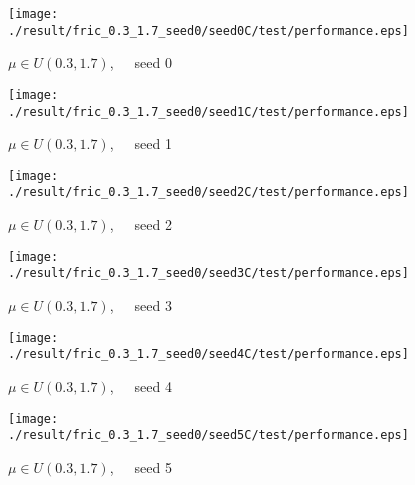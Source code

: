 \begin{figure}[p]
 \begin{minipage}{0.49\hsize}
  \begin{center}
 \texttt{[image: ./result/fric\_0.3\_1.7\_seed0/seed0C/test/performance.eps]}
  \caption{$\mu\in U(0.3,1.7)$,~~~seed 0
  }
  \end{center}
 \end{minipage}
 \begin{minipage}{0.49\hsize}
   \begin{center}
 \texttt{[image: ./result/fric\_0.3\_1.7\_seed0/seed1C/test/performance.eps]}
  \caption{$\mu\in U(0.3,1.7)$,~~~seed 1
  }
  \end{center}
 \end{minipage}
\end{figure}

\begin{figure}[p]
 \begin{minipage}{0.49\hsize}
  \begin{center}
 \texttt{[image: ./result/fric\_0.3\_1.7\_seed0/seed2C/test/performance.eps]}
  \caption{$\mu\in U(0.3,1.7)$,~~~seed 2
  }
  \end{center}
 \end{minipage}
 \begin{minipage}{0.49\hsize}
   \begin{center}
 \texttt{[image: ./result/fric\_0.3\_1.7\_seed0/seed3C/test/performance.eps]}
  \caption{$\mu\in U(0.3,1.7)$,~~~seed 3
  }
  \end{center}
 \end{minipage}
\end{figure}

\begin{figure}[p]
 \begin{minipage}{0.49\hsize}
  \begin{center}
 \texttt{[image: ./result/fric\_0.3\_1.7\_seed0/seed4C/test/performance.eps]}
  \caption{$\mu\in U(0.3,1.7)$,~~~seed 4
  }
  \end{center}
 \end{minipage}
 \begin{minipage}{0.49\hsize}
   \begin{center}
 \texttt{[image: ./result/fric\_0.3\_1.7\_seed0/seed5C/test/performance.eps]}
  \caption{$\mu\in U(0.3,1.7)$,~~~seed 5
  }
  \end{center}
 \end{minipage}
\end{figure}
